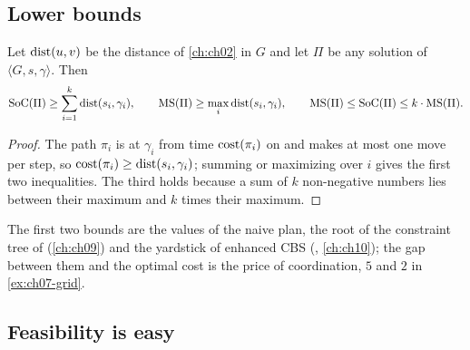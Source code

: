 \subsection{Lower bounds}

\begin{proposition}
\label{prop:ch07-bounds}
Let $\operatorname{dist}(u, v)$ be the distance of \cref{ch:ch02} in $G$
and let $\Pi$ be any solution of $\langle G, s, \gamma\rangle$. Then
\begin{equation}
  \mathrm{SoC}(\Pi) \ge \sum_{i=1}^{k} \operatorname{dist}(s_i, \gamma_i), \qquad
  \mathrm{MS}(\Pi) \ge \max_{i} \operatorname{dist}(s_i, \gamma_i), \qquad
  \mathrm{MS}(\Pi) \le \mathrm{SoC}(\Pi) \le k \cdot \mathrm{MS}(\Pi).
  \label{eq:ch07-bounds}
\end{equation}
\end{proposition}
\begin{proof}
The path $\pi_i$ is at $\gamma_i$ from time $\operatorname{cost}(\pi_i)$ on and makes at most
one move per step, so $\operatorname{cost}(\pi_i) \ge \operatorname{dist}(s_i, \gamma_i)$; summing or maximizing
over $i$ gives the first two inequalities. The third holds because a sum of
$k$ non-negative numbers lies between their maximum and $k$ times their
maximum.
\end{proof}

The first two bounds are the values of the naive plan, the root of the constraint tree of \cbs (\cref{ch:ch09}) and the
yardstick of enhanced CBS (\ecbs, \cref{ch:ch10}); the gap between them and the optimal
cost is the price of coordination, $5$ and $2$ in \cref{ex:ch07-grid}.

\subsection{Feasibility is easy}

